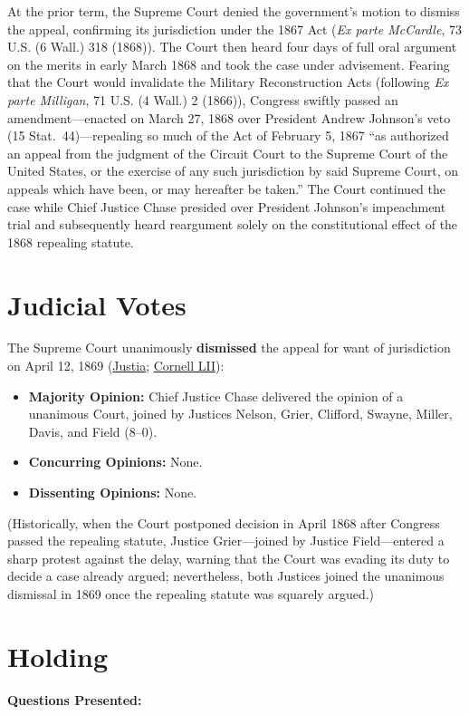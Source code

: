 \documentclass[12pt]{article}
\begin{document}
At the prior term, the Supreme Court denied the government's motion to dismiss the appeal, confirming its jurisdiction under the 1867 Act (\textit{Ex parte McCardle}, 73 U.S. (6 Wall.) 318 (1868)). The Court then heard four days of full oral argument on the merits in early March 1868 and took the case under advisement. Fearing that the Court would invalidate the Military Reconstruction Acts (following \textit{Ex parte Milligan}, 71 U.S. (4 Wall.) 2 (1866)), Congress swiftly passed an amendment---enacted on March 27, 1868 over President Andrew Johnson's veto (15 Stat.\ 44)---repealing so much of the Act of February 5, 1867 ``as authorized an appeal from the judgment of the Circuit Court to the Supreme Court of the United States, or the exercise of any such jurisdiction by said Supreme Court, on appeals which have been, or may hereafter be taken.'' The Court continued the case while Chief Justice Chase presided over President Johnson's impeachment trial and subsequently heard reargument solely on the constitutional effect of the 1868 repealing statute.

\section{Judicial Votes}
The Supreme Court unanimously \textbf{dismissed} the appeal for want of jurisdiction on April 12, 1869 (\href{https://supreme.justia.com/cases/federal/us/74/506/}{Justia}; \href{https://www.law.cornell.edu/supremecourt/text/74/506}{Cornell LII}):

\begin{itemize}
    \item \textbf{Majority Opinion:} Chief Justice Chase delivered the opinion of a unanimous Court, joined by Justices Nelson, Grier, Clifford, Swayne, Miller, Davis, and Field (8--0).
    \item \textbf{Concurring Opinions:} None.
    \item \textbf{Dissenting Opinions:} None.
\end{itemize}

(Historically, when the Court postponed decision in April 1868 after Congress passed the repealing statute, Justice Grier---joined by Justice Field---entered a sharp protest against the delay, warning that the Court was evading its duty to decide a case already argued; nevertheless, both Justices joined the unanimous dismissal in 1869 once the repealing statute was squarely argued.)

\section{Holding}
\textbf{Questions Presented:}
\end{document}

